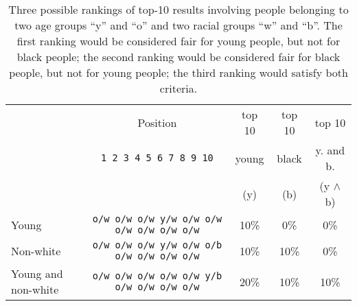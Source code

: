 \begin{table}[t]
	\caption{Three possible rankings of top-10 results involving people belonging to two age groups ``y'' and ``o'' and two racial groups ``w'' and ``b''. The first ranking would be considered fair for young people, but not for black people; the second ranking would be considered fair for black people, but not for young people; the third ranking would satisfy both criteria.
		\label{tbl:multinomial_intro_example}}

	\centering\small\begin{tabular}{lcccc}\toprule
		& Position					  & top 10 & top 10  & top 10 \\
		& \texttt{1 2 3 4 5 6 7 8 9 10} & young & black & y. and b. \\
		&                               &  (y)  & (b)  &  (y $\wedge$ b)\\
		\midrule
		Young  & \texttt{o/w o/w o/w y/w o/w o/w o/w o/w o/w o/w} & 10\% & 0\% & 0\% \\
		Non-white & \texttt{o/w o/w o/w y/w o/w o/b o/w o/w o/w o/w} & 10\% & 10\% & 0\% \\
		Young and non-white & \texttt{o/w o/w o/w o/w o/w y/b o/w o/w o/w o/w} & 20\% & 10\% & 10\% \\
		\bottomrule
	\end{tabular}

\end{table}


